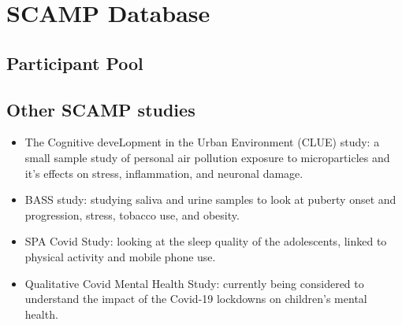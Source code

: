 \section{SCAMP Database} \label{App:SCAMP}

\subsection{Participant Pool}

\subsection{Other SCAMP studies} \label{App: SCAMP studies}
\begin{itemize}
    \item The Cognitive deveLopment in the Urban Environment (CLUE) study: a small sample study of personal air pollution exposure to microparticles and it's effects on stress, inflammation, and neuronal damage.
    \item BASS study: studying saliva and urine samples to look at puberty onset and progression, stress, tobacco use, and obesity.
    \item SPA Covid Study: looking at the sleep quality of the adolescents, linked to physical activity and mobile phone use.
    \item Qualitative Covid Mental Health Study: currently being considered to understand the impact of the Covid-19 lockdowns on children's mental health.
\end{itemize}